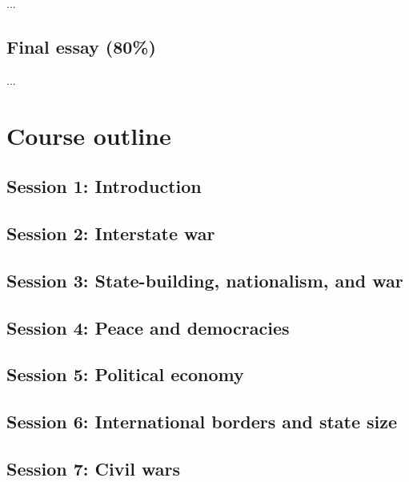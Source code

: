 \documentclass[12pt, a4paper]{article}
\begin{document}
...

\subsection*{Final essay (80\%)}

...

\newpage
\section{Course outline}


\subsection*{Session 1: Introduction}

\subsection*{Session 2: Interstate war}

\subsection*{Session 3: State-building, nationalism, and war}

\subsection*{Session 4: Peace and democracies}

\subsection*{Session 5: Political economy}

\subsection*{Session 6: International borders and state size}

\subsection*{Session 7: Civil wars}
\end{document}
